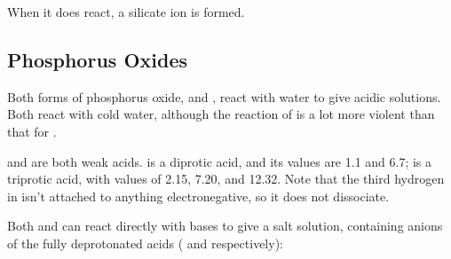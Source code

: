 			When it does react, a silicate ion is formed.




		\pagebreak
		\subsection{Phosphorus Oxides}

			Both forms of phosphorus oxide,  and , react with water to give acidic solutions. Both react with cold water,
			although the reaction of  is a lot more violent than that for .


			 and  are both weak acids.  is a diprotic acid, and its \pKa{} values are \num{1.1} and \num{6.7};
			 is a triprotic acid, with \pKa{} values of \num{2.15}, \num{7.20}, and \num{12.32}. Note that the third hydrogen
			in  isn't attached to anything electronegative, so it does not dissociate.


			Both  and  can react directly with bases to give a salt solution, containing anions of the fully deprotonated
			acids ( and  respectively):



